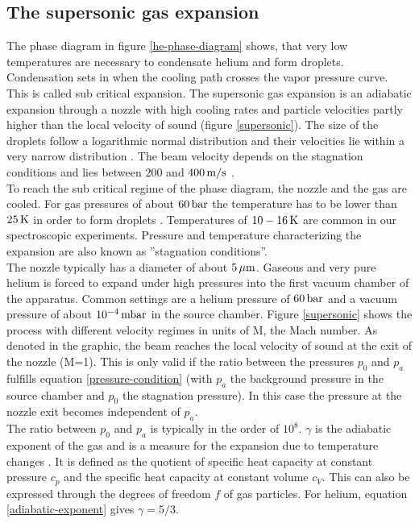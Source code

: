 \documentclass[parskip,12pt,headsepline,a4paper] {scrbook}
\begin{document}
\subsection{The supersonic gas expansion}
\vspace{-1\baselineskip}
The phase diagram in figure \ref{he-phase-diagram} shows, that very low temperatures are necessary to condensate helium and form droplets. Condensation sets in when the cooling path crosses the vapor pressure curve. This is called sub critical expansion. The supersonic gas expansion is an adiabatic expansion through a nozzle with high cooling rates and particle velocities partly higher than the local velocity of sound (figure \ref{supersonic}). The size of the droplets follow a logarithmic normal distribution and their velocities lie within a very narrow distribution \cite{scoles} \cite{scoles2}. The beam velocity depends on the stagnation conditions and lies between $200$ and $\unit[400]{m/s}$ \cite{toennis}.\\
To reach the sub critical regime of the phase diagram, the nozzle and the gas are cooled. For gas pressures of about $\unit[60]{bar}$ the temperature has to be lower than $\unit[25]{K}$ in order to form droplets \cite{nanolab}. Temperatures of $\unit[10-16]{K}$ are common in our spectroscopic experiments. Pressure and temperature characterizing the expansion are also known as ''stagnation conditions''. \\
The nozzle typically has a diameter of about $\unit[5]{\mu m}$. Gaseous and very pure helium is forced to expand under high pressures into the first vacuum chamber of the apparatus. Common settings are a helium pressure of $\unit[60]{bar}$ and a vacuum pressure of about $\unit[10^{-4}]{mbar}$ in the source chamber. Figure \ref{supersonic} shows the process with different velocity regimes in units of M, the Mach number. As denoted in the graphic, the beam reaches the local velocity of sound at the exit of the nozzle (M=1). This is only valid if the ratio between the pressures $p_0$ and $p_a$ fulfills equation \ref{pressure-condition} (with $p_a$ the background pressure in the source chamber and $p_0$ the stagnation pressure). In this case the pressure at the nozzle exit becomes independent of $p_a$. \\
The ratio between $p_0$ and $p_a$ is typically in the order of $10^8$. $\gamma$ is the adiabatic exponent of the gas and is a measure for the expansion due to temperature changes \cite{demtr1}. It is defined as the quotient of specific heat capacity at constant pressure $c_p$ and the specific heat capacity at constant volume $c_V$. This can also be expressed through the degrees of freedom $f$ of gas particles. For helium, equation \ref{adiabatic-exponent} gives $\gamma = 5/3$.
\end{document}

